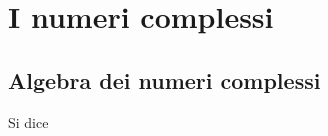 \chapter{I numeri complessi}

\section{Algebra dei numeri complessi}

\begin{definition}
    Si dice \emph{}
\end{definition}
